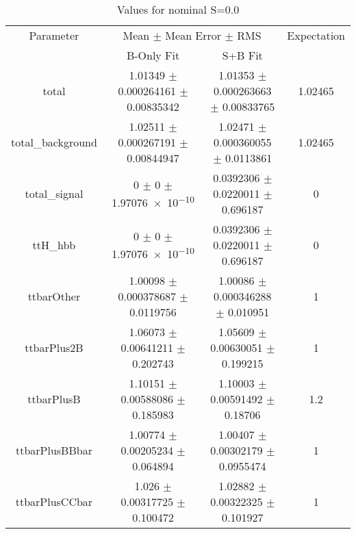 \begin{table}
\centering
\caption{Values for nominal S=0.0}
\begin{tabular}{cccc}
\toprule
Parameter & \multicolumn{2}{c}{Mean $\pm$ Mean Error $\pm$ RMS} & Expectation\\
 & B-Only Fit & S+B Fit & \\
\midrule
total & \num{1.01349} $\pm$ \num{0.000264161} $\pm$ \num{0.00835342} & \num{1.01353} $\pm$ \num{0.000263663} $\pm$ \num{0.00833765} & \num{1.02465}\\
total\_background & \num{1.02511} $\pm$ \num{0.000267191} $\pm$ \num{0.00844947} & \num{1.02471} $\pm$ \num{0.000360055} $\pm$ \num{0.0113861} & \num{1.02465}\\
total\_signal & \num{0} $\pm$ \num{0} $\pm$ \num{1.97076e-10} & \num{0.0392306} $\pm$ \num{0.0220011} $\pm$ \num{0.696187} & \num{0}\\
ttH\_hbb & \num{0} $\pm$ \num{0} $\pm$ \num{1.97076e-10} & \num{0.0392306} $\pm$ \num{0.0220011} $\pm$ \num{0.696187} & \num{0}\\
ttbarOther & \num{1.00098} $\pm$ \num{0.000378687} $\pm$ \num{0.0119756} & \num{1.00086} $\pm$ \num{0.000346288} $\pm$ \num{0.010951} & \num{1}\\
ttbarPlus2B & \num{1.06073} $\pm$ \num{0.00641211} $\pm$ \num{0.202743} & \num{1.05609} $\pm$ \num{0.00630051} $\pm$ \num{0.199215} & \num{1}\\
ttbarPlusB & \num{1.10151} $\pm$ \num{0.00588086} $\pm$ \num{0.185983} & \num{1.10003} $\pm$ \num{0.00591492} $\pm$ \num{0.18706} & \num{1.2}\\
ttbarPlusBBbar & \num{1.00774} $\pm$ \num{0.00205234} $\pm$ \num{0.064894} & \num{1.00407} $\pm$ \num{0.00302179} $\pm$ \num{0.0955474} & \num{1}\\
ttbarPlusCCbar & \num{1.026} $\pm$ \num{0.00317725} $\pm$ \num{0.100472} & \num{1.02882} $\pm$ \num{0.00322325} $\pm$ \num{0.101927} & \num{1}\\
\bottomrule
\end{tabular}
\end{table}